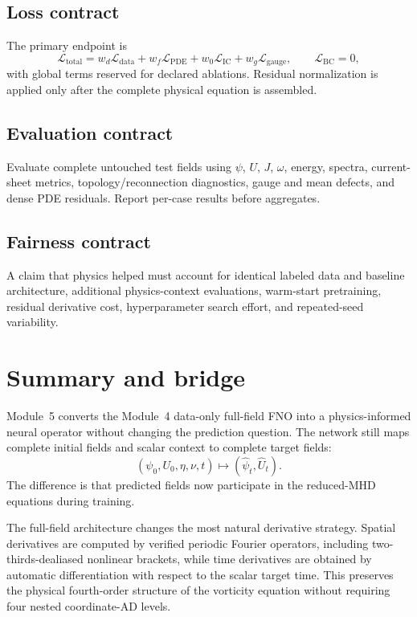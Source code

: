 \documentclass[11pt]{article}
\newcommand{\Ldata}{\mathcal{L}_{\mathrm{data}}}
\newcommand{\Lpde}{\mathcal{L}_{\mathrm{PDE}}}
\newcommand{\Lic}{\mathcal{L}_{\mathrm{IC}}}
\newcommand{\Lbc}{\mathcal{L}_{\mathrm{BC}}}
\newcommand{\Lgauge}{\mathcal{L}_{\mathrm{gauge}}}
\newcommand{\Ltotal}{\mathcal{L}_{\mathrm{total}}}
\begin{document}
\subsection{Loss contract}
The primary endpoint is
\begin{equation}
\Ltotal=w_d\Ldata+w_f\Lpde+w_0\Lic+w_g\Lgauge,
\qquad \Lbc=0,
\end{equation}
with global terms reserved for declared ablations. Residual normalization is applied only after the complete physical equation is assembled.

\subsection{Evaluation contract}
Evaluate complete untouched test fields using $\psi$, $U$, $J$, $\omega$, energy, spectra, current-sheet metrics, topology/reconnection diagnostics, gauge and mean defects, and dense PDE residuals. Report per-case results before aggregates.

\subsection{Fairness contract}
A claim that physics helped must account for identical labeled data and baseline architecture, additional physics-context evaluations, warm-start pretraining, residual derivative cost, hyperparameter search effort, and repeated-seed variability.

\section{Summary and bridge}
\label{sec:summary}

Module~5 converts the Module~4 data-only full-field FNO into a physics-informed neural operator without changing the prediction question. The network still maps complete initial fields and scalar context to complete target fields:
\[
(\psi_0,U_0,\eta,\nu,t)\mapsto(\widehat\psi_t,\widehat U_t).
\]
The difference is that predicted fields now participate in the reduced-MHD equations during training.

The full-field architecture changes the most natural derivative strategy. Spatial derivatives are computed by verified periodic Fourier operators, including two-thirds-dealiased nonlinear brackets, while time derivatives are obtained by automatic differentiation with respect to the scalar target time. This preserves the physical fourth-order structure of the vorticity equation without requiring four nested coordinate-AD levels.
\end{document}
